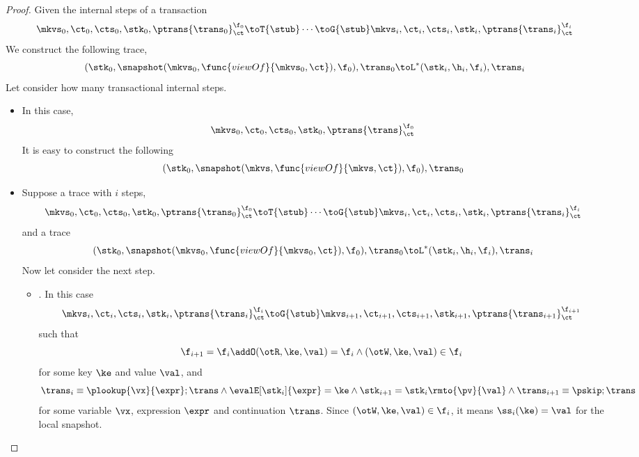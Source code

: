 \begin{proof}
    Given the internal steps of a transaction
    \[
        \mkvs_0, \ct_0, \cts_0, \stk_0, \ptrans{\trans_0}_\ct^{\f_0} \toT{\stub} 
        \cdots  \toG{\stub} \mkvs_i, \ct_i, \cts_i, \stk_i, \ptrans{\trans_i}_\ct^{\f_i}
    \]
    We construct the following trace,
    \[
        (\stk_0, \snapshot(\mkvs_0,\func{viewOf}{\mkvs_0,\ct}), \f_0), \trans_0 \toL^*
        (\stk_i, \h_i, \f_i), \trans_i
    \]
    Let consider how many transactional internal steps.
    \begin{itemize}
        \item {}
        In this case, 
        \[
            \mkvs_0, \ct_0, \cts_0, \stk_0, \ptrans{\trans}_\ct^{\f_0}
        \]
        It is easy to construct the following
        \[
            (\stk_0, \snapshot(\mkvs,\func{viewOf}{\mkvs,\ct}), \f_0), \trans_0 
        \]
        \item {}
        Suppose  a trace with \(i\) steps,
        \[
            \mkvs_0, \ct_0, \cts_0, \stk_0, \ptrans{\trans_0}_\ct^{\f_0} \toT{\stub} 
            \cdots  \toG{\stub} \mkvs_i, \ct_i, \cts_i, \stk_i, \ptrans{\trans_i}_\ct^{\f_i}
        \]
        and a trace
        \[
            (\stk_0, \snapshot(\mkvs_0,\func{viewOf}{\mkvs_0,\ct}), \f_0), \trans_0 \toL^*
            (\stk_i, \h_i, \f_i), \trans_i
        \]
        Now let consider the next step.
        \begin{itemize}
            \item {}.
                In this case
                \[
                    \mkvs_i, \ct_i, \cts_i, \stk_i, \ptrans{\trans_i}_\ct^{\f_i}
                    \toG{\stub}
                    \mkvs_{i+1}, \ct_{i+1}, \cts_{i+1}, \stk_{i+1}, \ptrans{\trans_{i+1}}_\ct^{\f_{i+1}}
                \]
                such that
                \[
                    \f_{i+1} = \f_i \addO (\otR, \ke, \val)  = \f_i
                    \land (\otW,\ke, \val) \in \f_i
                \]
                for some key \( \ke \) and value \( \val \), and
                \[
                    \trans_{i} \equiv \plookup{\vx}{\expr} ; \trans 
                    \land \evalE[\stk_i]{\expr} = \ke 
                    \land \stk_{i+1} = \stk_i\rmto{\pv}{\val}
                    \land  \trans_{i+1} \equiv \pskip ; \trans
                \]
                for some variable \( \vx \), expression \( \expr \) and continuation \( \trans \).
                Since \( ( \otW, \ke ,\val ) \in \f_i  \), it means \( \ss_i(\ke) = \val \) for the local snapshot.

\end{itemize}
\end{itemize}
\end{proof}
